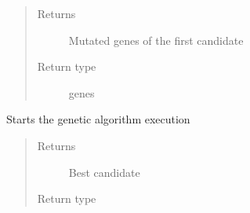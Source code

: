 \documentclass[letterpaper,10pt,english]{sphinxmanual}
\begin{document}
\begin{fulllineitems}
\begin{fulllineitems}
\begin{quote}
\begin{description}
\item[{Returns}] \leavevmode
\sphinxAtStartPar
Mutated genes of the first candidate

\item[{Return type}] \leavevmode
\sphinxAtStartPar
genes

\end{description}\end{quote}

\end{fulllineitems}


\begin{fulllineitems}
\label{\detokenize{MolOpt.genetic:MolOpt.genetic.genetic.Genetic.run}}
\sphinxAtStartPar
Starts the genetic algorithm execution
\begin{quote}\begin{description}
\item[{Returns}] \leavevmode
\sphinxAtStartPar
Best candidate

\item[{Return type}] \leavevmode
\sphinxAtStartPar
{\hyperref[\detokenize{MolOpt.genetic:MolOpt.genetic.genetic.Chromosome}]{}}

\end{description}\end{quote}

\end{fulllineitems}



\end{fulllineitems}
\end{document}
